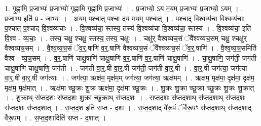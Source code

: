 \documentclass[17pt]{extarticle}
\begin{document}
1. गृ॒ह्णा॒मि॒ प्र॒जाभ्यः॑ प्र॒जाभ्यो॑ गृह्णामि गृह्णामि प्र॒जाभ्यः॑ । . प्र॒जाभ्यो॒ ऽय म॒यम् प्र॒जाभ्यः॑ प्र॒जाभ्यो॒ ऽयम् । . प्र॒जाभ्य॒ इति॑ प्र - जाभ्यः॑ । . अ॒यम् प॒श्चात् प॒श्चा द॒य म॒यम् प॒श्चात् । . प॒श्चाद् वि॒श्वव्य॑चा वि॒श्वव्य॑चाः प॒श्चात् प॒श्चाद् वि॒श्वव्य॑चाः । . वि॒श्वव्य॑चा॒ स्तस्य॒ तस्य॑ वि॒श्वव्य॑चा वि॒श्वव्य॑चा॒ स्तस्य॑ । . वि॒श्वव्य॑चा॒ इति॑ वि॒श्व - व्य॒चाः॒ । . तस्य॒ चक्षु॒ श्चक्षु॒ स्तस्य॒ तस्य॒ चक्षुः॑ । . चक्षु॑र् वैश्वव्यच॒सं ॅवै᳚श्वव्यच॒सम् चक्षु॒ श्चक्षु॑र् वैश्वव्यच॒सम् । . वै॒श्व॒व्य॒च॒सं ॅव॒र्॒.षाणि॑ व॒र्॒.षाणि॑ वैश्वव्यच॒सं ॅवै᳚श्वव्यच॒सं ॅव॒र्॒.षाणि॑ । . वै॒श्व॒व्य॒च॒समिति॑ वैश्व - व्य॒च॒सम् । . व॒र्॒.षाणि॑ चाक्षु॒षाणि॑ चाक्षु॒षाणि॑ व॒र्॒.षाणि॑ व॒र्॒.षाणि॑ चाक्षु॒षाणि॑ । . चा॒क्षु॒षाणि॒ जग॑ती॒ जग॑ती चाक्षु॒षाणि॑ चाक्षु॒षाणि॒ जग॑ती । . जग॑ती वा॒र्॒.षी वा॒र्॒.षी जग॑ती॒ जग॑ती वा॒र्॒.षी । . वा॒र्॒.षी जग॑त्या॒ जग॑त्या वा॒र्॒.षी वा॒र्॒.षी जग॑त्याः । . जग॑त्या॒ ऋक्ष॑म॒ मृक्ष॑म॒म् जग॑त्या॒ जग॑त्या॒ ऋक्ष॑मम् । . ऋक्ष॑म॒ मृक्ष॑मा॒ दृक्ष॑मा॒ दृक्ष॑म॒ मृक्ष॑म॒ मृक्ष॑मात् । . ऋक्ष॑मा च्छु॒क्रः शु॒क्र ऋक्ष॑मा॒ दृक्ष॑मा च्छु॒क्रः । . शु॒क्रः शु॒क्रा च्छु॒क्रा च्छु॒क्रः शु॒क्रः शु॒क्रात् । . शु॒क्राथ् स॑प्तद॒शः स॑प्तद॒शः शु॒क्रा च्छु॒क्राथ् स॑प्तद॒शः । . स॒प्त॒द॒शः स॑प्तद॒शाथ् स॑प्तद॒शाथ् स॑प्तद॒शः स॑प्तद॒शः स॑प्तद॒शात् । . स॒प्त॒द॒श इति॑ सप्त - द॒शः । . स॒प्त॒द॒शाद् वै॑रू॒पं ॅवै॑रू॒पꣳ स॑प्तद॒शाथ् स॑प्तद॒शाद् वै॑रू॒पम् । . स॒प्त॒द॒शादिति॑ सप्त - द॒शात् । \newline
\end{document}
